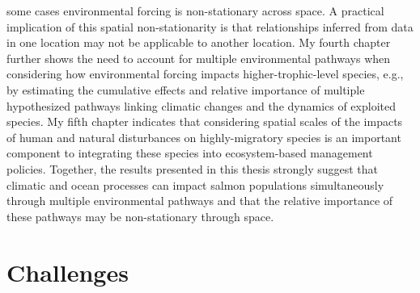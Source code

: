 \begin{enumerate}
  some cases environmental forcing is non-stationary across space. A
  practical implication of this spatial non-stationarity is that
  relationships inferred from data in one location may not be applicable
  to another location. My fourth chapter further shows the need to
  account for multiple environmental pathways when considering how
  environmental forcing impacts higher-trophic-level species, e.g., by
  estimating the cumulative effects and relative importance of multiple
  hypothesized pathways linking climatic changes and the dynamics of
  exploited species. My fifth chapter indicates that considering spatial
  scales of the impacts of human and natural disturbances on
  highly-migratory species is an important component to integrating
  these species into ecosystem-based management policies. Together, the
  results presented in this thesis strongly suggest that climatic and
  ocean processes can impact salmon populations simultaneously through
  multiple environmental pathways and that the relative importance of
  these pathways may be non-stationary through space.
\end{enumerate}

\section{Challenges}\label{challenges}

